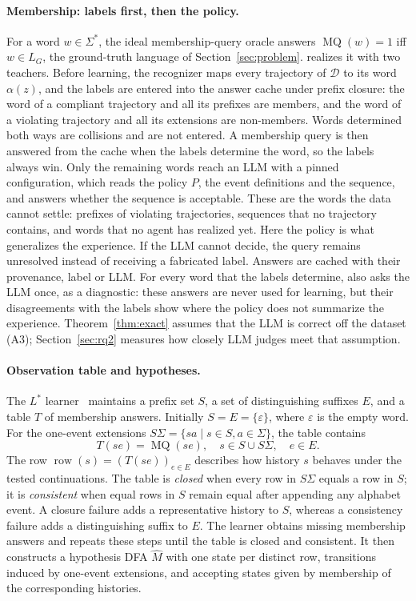 \paragraph{Membership: labels first, then the policy.}
For a word $w\in\Sigma^*$, the ideal membership-query oracle answers $\operatorname{MQ}(w)=1$ iff $w\in L_G$, the ground-truth language of Section~\ref{sec:problem}. \system realizes it with two teachers. Before learning, the recognizer maps every trajectory of $\mathcal{D}$ to its word $\alpha(z)$, and the labels are entered into the answer cache under prefix closure: the word of a compliant trajectory and all its prefixes are members, and the word of a violating trajectory and all its extensions are non-members. Words determined both ways are collisions and are not entered. A membership query is then answered from the cache when the labels determine the word, so the labels always win. Only the remaining words reach an LLM with a pinned configuration, which reads the policy $P$, the event definitions and the sequence, and answers whether the sequence is acceptable. These are the words the data cannot settle: prefixes of violating trajectories, sequences that no trajectory contains, and words that no agent has realized yet. Here the policy is what generalizes the experience. If the LLM cannot decide, the query remains unresolved instead of receiving a fabricated label. Answers are cached with their provenance, label or LLM. For every word that the labels determine, \system also asks the LLM once, as a diagnostic: these answers are never used for learning, but their disagreements with the labels show where the policy does not summarize the experience. Theorem~\ref{thm:exact} assumes that the LLM is correct off the dataset (A3); Section~\ref{sec:rq2} measures how closely LLM judges meet that assumption.

\paragraph{Observation table and hypotheses.}
The $L^*$ learner~\cite{angluin1987learning} maintains a prefix set $S$, a set of distinguishing suffixes $E$, and a table $T$ of membership answers. Initially $S=E=\{\varepsilon\}$, where $\varepsilon$ is the empty word. For the one-event extensions $S\Sigma=\{sa\mid s\in S,a\in\Sigma\}$, the table contains
\[
 T(se)=\operatorname{MQ}(se),\quad
 s\in S\cup S\Sigma,\quad e\in E.
\]
The row $\operatorname{row}(s)=(T(se))_{e\in E}$ describes how history $s$ behaves under the tested continuations. The table is \emph{closed} when every row in $S\Sigma$ equals a row in $S$; it is \emph{consistent} when equal rows in $S$ remain equal after appending any alphabet event. A closure failure adds a representative history to $S$, whereas a consistency failure adds a distinguishing suffix to $E$. The learner obtains missing membership answers and repeats these steps until the table is closed and consistent. It then constructs a hypothesis DFA $\widehat M$ with one state per distinct row, transitions induced by one-event extensions, and accepting states given by membership of the corresponding histories.

